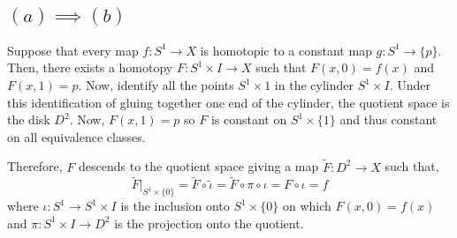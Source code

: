 \documentclass[12pt]{extarticle}
\begin{document}
\subsection*{$(a) \implies (b)$}
Suppose that every map $f : S^1 \to X$ is homotopic to a constant map $g : S^1 \to \{p\}$. Then, there exists a homotopy $F : S^1 \times I \to X$ such that $F(x, 0) = f(x)$ and $F(x, 1) = p$. Now, identify all the points $S^1 \times {1}$ in the cylinder $S^1 \times I$. Under this identification of gluing together one end of the cylinder, the quotient space is the disk $D^2$. Now, $F(x, 1) = p$ so $F$ is constant on $S^1 \times \{1\}$ and thus constant on all equivalence classes.
\begin{center}
\end{center}
Therefore, $F$ descends to the quotient space giving a map $\tilde{F} : D^2 \to X$ such that, \[\tilde{F}|_{S^1 \times \{0\} } = \tilde{F} \circ \tilde{\iota} = \tilde{F} \circ \pi \circ \iota = F \circ \iota = f\]
where $\iota : S^1 \to S^1 \times I$ is the inclusion onto $S^1 \times \{0\}$ on which $F(x, 0) = f(x)$ and $\pi : S^1 \times I \to D^2$ is the projection onto the quotient. \bigskip \\
\end{document}
